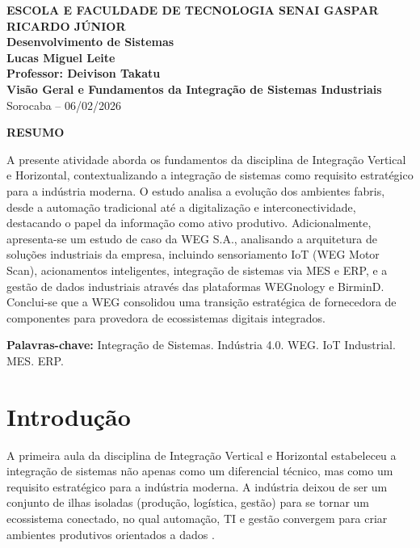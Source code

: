 \documentclass[12pt,a4paper,oneside]{article}
\begin{document}
\begin{center}
  \textbf{\large ESCOLA E FACULDADE DE TECNOLOGIA SENAI GASPAR RICARDO JÚNIOR}\\
  \textbf{Desenvolvimento de Sistemas}\\[1cm]
  \textbf{\Large Lucas Miguel Leite}\\[0.5cm]
  \textbf{Professor: Deivison Takatu}\\[2cm]
  \textbf{\LARGE\textbf{Visão Geral e Fundamentos da Integração de Sistemas Industriais}}\\[1cm]
  Sorocaba -- 06/02/2026
\end{center}

\vspace{1cm}

\begin{center}
  \textbf{RESUMO}
\end{center}

A presente atividade aborda os fundamentos da disciplina de Integração Vertical e Horizontal, contextualizando a integração de sistemas como requisito estratégico para a indústria moderna. O estudo analisa a evolução dos ambientes fabris, desde a automação tradicional até a digitalização e interconectividade, destacando o papel da informação como ativo produtivo. Adicionalmente, apresenta-se um estudo de caso da WEG S.A., analisando a arquitetura de soluções industriais da empresa, incluindo sensoriamento IoT (WEG Motor Scan), acionamentos inteligentes, integração de sistemas via MES e ERP, e a gestão de dados industriais através das plataformas WEGnology e BirminD. Conclui-se que a WEG consolidou uma transição estratégica de fornecedora de componentes para provedora de ecossistemas digitais integrados.

\vspace{0.5cm}
\textbf{Palavras-chave:} Integração de Sistemas. Indústria 4.0. WEG. IoT Industrial. MES. ERP.

\newpage

\section{Introdução}

A primeira aula da disciplina de Integração Vertical e Horizontal estabeleceu a integração de sistemas não apenas como um diferencial técnico, mas como um requisito estratégico para a indústria moderna. A indústria deixou de ser um conjunto de ilhas isoladas (produção, logística, gestão) para se tornar um ecossistema conectado, no qual automação, TI e gestão convergem para criar ambientes produtivos orientados a dados \cite{groover2011}.
\end{document}
